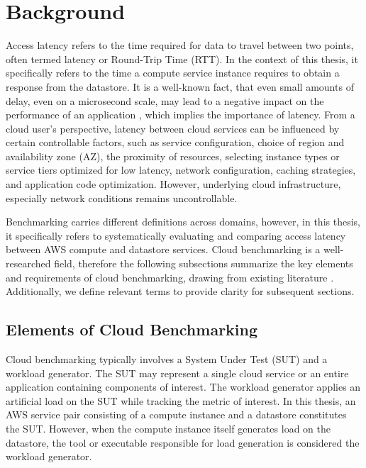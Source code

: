 \section{Background}
\label{cha:background}

Access latency refers to the time required for data to travel between two points, often termed latency or Round-Trip Time (RTT). In the context of this thesis, it specifically refers to the time a compute service instance requires to obtain a response from the datastore. It is a well-known fact, that even small amounts of delay, even on a microsecond scale, may lead to a negative impact on the performance of an application \cite{atricle_dean_tail,book_popescu_netlat}, which implies the importance of latency.
%
From a cloud user's perspective, latency between cloud services can be influenced by certain controllable factors, such as service configuration, choice of region and availability zone (AZ), the proximity of resources, selecting instance types or service tiers optimized for low latency, network configuration, caching strategies, and application code optimization. However, underlying cloud infrastructure, especially network conditions remains uncontrollable.

Benchmarking carries different definitions across domains, however, in this thesis, it specifically refers to systematically evaluating and comparing access latency between AWS compute and datastore services. Cloud benchmarking is a well-researched field, therefore the following subsections summarize the key elements and requirements of cloud benchmarking, drawing from existing literature \cite{paper_binnig_weather,paper_cooper_ycsb,paper_folkerts_benchmarking,book_bermbach_cloud_service_benchmarking}. Additionally, we define relevant terms to provide clarity for subsequent sections.

\subsection{Elements of Cloud Benchmarking}
\label{elems_of_bench}

Cloud benchmarking typically involves a System Under Test (SUT) and a workload generator. The SUT may represent a single cloud service or an entire application containing components of interest. The workload generator applies an artificial load on the SUT while tracking the metric of interest. In this thesis, an AWS service pair consisting of a compute instance and a datastore constitutes the SUT. However, when the compute instance itself generates load on the datastore, the tool or executable responsible for load generation is considered the workload generator.

